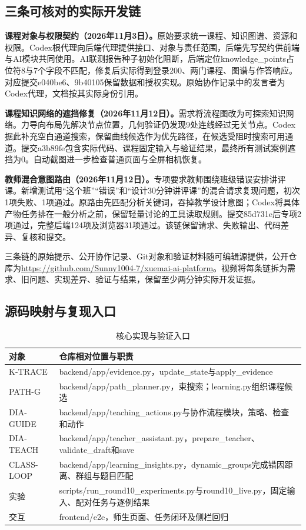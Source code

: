 \documentclass[UTF8,zihao=-4,fontset=none,a4paper]{ctexart}
\begin{document}
\subsection{三条可核对的实际开发链}
\textbf{课程对象与权限契约（2026年11月3日）。}原始要求统一课程、知识图谱、资源和权限。Codex根代理向后端代理提供接口、对象与责任范围，后端先写契约供前端与AI模块共同使用。AI联测报告种子初始化阻断，后端定位knowledge\_points占位符8与7个字段不匹配，修复后实际得到登录200、两门课程、图谱与作答响应。对应提交e040be6、9b40105保留数据和授权实现。原始协作记录中的发言者为Codex代理，文档按其实际身份引用。

\textbf{课程知识网络的遮挡修复（2026年11月12日）。}需求将流程图改为可探索知识网络。力导向布局先解决节点位置，几何验证仍发现9处连线经过无关节点。Codex据此补充空白通道搜索，保留曲线候选作为优先路径，在候选受阻时搜索可用通道。提交a3b89fe包含实际代码、课程固定输入与验证结果，最终所有测试案例遮挡为0。自动截图进一步检查普通页面与全屏相机恢复。

\textbf{教师混合意图路由（2026年11月12日）。}专项要求教师围绕班级错误安排讲评课。新增测试用“这个班”“错误”和“设计30分钟讲评课”的混合请求复现问题，初次1项失败、1项通过。原路由先匹配分析关键词，吞掉教学设计意图；Codex将具体产物任务排在一般分析之前，保留轻量讨论的工具读取规则。提交85d731e后专项2项通过，完整后端124项及浏览器31项通过。该链保留请求、失败输出、代码差异、复核和提交。

三条链的原始提示、公开协作记录、Git对象和验证材料随可编辑源提供，公开仓库为\url{https://github.com/Sunny1004-7/xuemai-ai-platform}。视频将每条链拆为需求、旧问题、实现差异、验证与结果，保留至少两分钟实际开发证据。

\subsection{源码映射与复现入口}
\begin{table}[htbp]\centering\caption{核心实现与验证入口}\begin{tabularx}{\linewidth}{p{2.9cm}Y}\toprule 对象&仓库相对位置与职责\\\midrule
\mbox{K-TRACE}&backend/app/evidence.py，update\_state与apply\_evidence\\
\mbox{PATH-G}&backend/app/path\_planner.py，束搜索；learning.py组织课程候选\\
\mbox{DIA-GUIDE}&backend/app/teaching\_actions.py与协作流程模块，策略、检查和动作\\
\mbox{DIA-TEACH}&backend/app/teacher\_assistant.py，prepare\_teacher、validate\_draft和save\\
\mbox{CLASS-LOOP}&backend/app/learning\_insights.py，dynamic\_groups完成错因距离、群组与题目匹配\\
实验&scripts/run\_round10\_experiments.py与round10\_live.py，固定输入、配对任务与逐例结果\\
交互&frontend/e2e，师生页面、任务闭环及侧栏回归\\\bottomrule\end{tabularx}\end{table}
\end{document}

